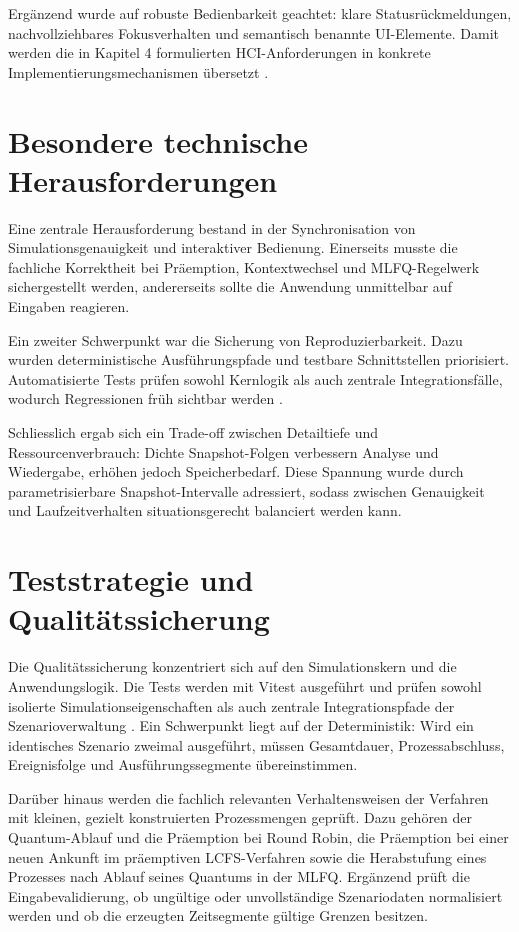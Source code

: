 Ergänzend wurde auf robuste Bedienbarkeit geachtet: klare Statusrückmeldungen, nachvollziehbares Fokusverhalten und semantisch benannte UI-Elemente. Damit werden die in Kapitel 4 formulierten HCI-Anforderungen in konkrete Implementierungsmechanismen übersetzt \cite{wcag2018,brooke1996sus}.

\section{Besondere technische Herausforderungen}

Eine zentrale Herausforderung bestand in der Synchronisation von Simulationsgenauigkeit und interaktiver Bedienung. Einerseits musste die fachliche Korrektheit bei Präemption, Kontextwechsel und MLFQ-Regelwerk sichergestellt werden, andererseits sollte die Anwendung unmittelbar auf Eingaben reagieren.

Ein zweiter Schwerpunkt war die Sicherung von Reproduzierbarkeit. Dazu wurden deterministische Ausführungspfade und testbare Schnittstellen priorisiert. Automatisierte Tests prüfen sowohl Kernlogik als auch zentrale Integrationsfälle, wodurch Regressionen früh sichtbar werden \cite{vitest}.

Schliesslich ergab sich ein Trade-off zwischen Detailtiefe und Ressourcenverbrauch: Dichte Snapshot-Folgen verbessern Analyse und Wiedergabe, erhöhen jedoch Speicherbedarf. Diese Spannung wurde durch parametrisierbare Snapshot-Intervalle adressiert, sodass zwischen Genauigkeit und Laufzeitverhalten situationsgerecht balanciert werden kann.

\section{Teststrategie und Qualitätssicherung}

Die Qualitätssicherung konzentriert sich auf den Simulationskern und die Anwendungslogik. Die Tests werden mit Vitest ausgeführt und prüfen sowohl isolierte Simulationseigenschaften als auch zentrale Integrationspfade der Szenarioverwaltung \cite{vitest}. Ein Schwerpunkt liegt auf der Deterministik: Wird ein identisches Szenario zweimal ausgeführt, müssen Gesamtdauer, Prozessabschluss, Ereignisfolge und Ausführungssegmente übereinstimmen.

Darüber hinaus werden die fachlich relevanten Verhaltensweisen der Verfahren mit kleinen, gezielt konstruierten Prozessmengen geprüft. Dazu gehören der Quantum-Ablauf und die Präemption bei Round Robin, die Präemption bei einer neuen Ankunft im präemptiven LCFS-Verfahren sowie die Herabstufung eines Prozesses nach Ablauf seines Quantums in der MLFQ. Ergänzend prüft die Eingabevalidierung, ob ungültige oder unvollständige Szenariodaten normalisiert werden und ob die erzeugten Zeitsegmente gültige Grenzen besitzen.

